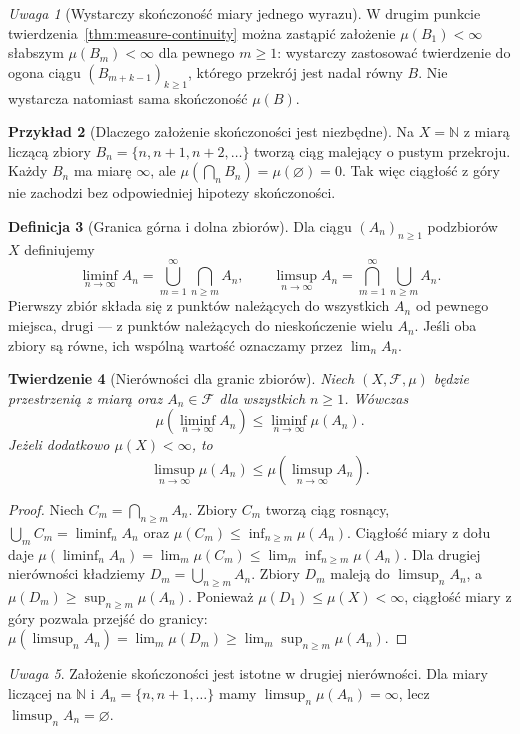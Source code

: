 \documentclass[11pt,a4paper,oneside]{book}
\numberwithin{equation}{chapter}
\theoremstyle{plain}
\newtheorem{twierdzenie}{Twierdzenie}[chapter]
\theoremstyle{definition}
\newtheorem{definicja}[twierdzenie]{Definicja}
\newtheorem{przyklad}[twierdzenie]{Przykład}
\theoremstyle{remark}
\newtheorem{uwaga}[twierdzenie]{Uwaga}
\begin{document}
\begin{uwaga}[Wystarczy skończoność miary jednego wyrazu]
W drugim punkcie twierdzenia~\ref{thm:measure-continuity} można
zastąpić założenie $\mu(B_1)<\infty$ słabszym
$\mu(B_m)<\infty$ dla pewnego $m\ge1$: wystarczy
zastosować twierdzenie do ogona ciągu
$(B_{m+k-1})_{k\ge1}$, którego przekrój jest nadal równy $B$.
Nie wystarcza natomiast sama skończoność $\mu(B)$.
\end{uwaga}

\begin{przyklad}[Dlaczego założenie skończoności jest niezbędne]
\label{ex:continuity-counterexample}
Na $X=\mathbb N$ z miarą liczącą zbiory
$B_n=\{n,n+1,n+2,\ldots\}$ tworzą ciąg malejący o pustym
przekroju. Każdy $B_n$ ma miarę $\infty$, ale
$\mu(\bigcap_nB_n)=\mu(\varnothing)=0$.
Tak więc ciągłość z góry nie zachodzi bez odpowiedniej
hipotezy skończoności.
\end{przyklad}

\begin{definicja}[Granica górna i dolna zbiorów]
\label{def:limsup-sets}
Dla ciągu $(A_n)_{n\geq1}$ podzbiorów $X$ definiujemy
\[
\liminf_{n\to\infty}A_n
=\bigcup_{m=1}^{\infty}\bigcap_{n\geq m}A_n,
\qquad
\limsup_{n\to\infty}A_n
=\bigcap_{m=1}^{\infty}\bigcup_{n\geq m}A_n.
\]
Pierwszy zbiór składa się z punktów należących do wszystkich
$A_n$ od pewnego miejsca, drugi --- z punktów należących do
nieskończenie wielu $A_n$. Jeśli oba zbiory są równe,
ich wspólną wartość oznaczamy przez $\lim_nA_n$.
\end{definicja}

\begin{twierdzenie}[Nierówności dla granic zbiorów]
\label{thm:fatou-for-sets}
Niech $(X,\mathcal F,\mu)$ będzie przestrzenią z miarą
oraz $A_n\in\mathcal F$ dla wszystkich $n\ge1$.
Wówczas
\[
 \mu(\liminf_{n\to\infty}A_n)
 \le \liminf_{n\to\infty}\mu(A_n).
\]
Jeżeli dodatkowo $\mu(X)<\infty$, to
\[
 \limsup_{n\to\infty}\mu(A_n)
 \le \mu(\limsup_{n\to\infty}A_n).
\]
\end{twierdzenie}
\begin{proof}
Niech $C_m=\bigcap_{n\ge m}A_n$.
Zbiory $C_m$ tworzą ciąg rosnący,
$\bigcup_m C_m=\liminf_n A_n$ oraz
$\mu(C_m)\le\inf_{n\ge m}\mu(A_n)$.
Ciągłość miary z dołu daje
$\mu(\liminf_n A_n)=\lim_m\mu(C_m)
\le\lim_m\inf_{n\ge m}\mu(A_n)$.
Dla drugiej nierówności kładziemy
$D_m=\bigcup_{n\ge m}A_n$.
Zbiory $D_m$ maleją do $\limsup_n A_n$,
a $\mu(D_m)\ge\sup_{n\ge m}\mu(A_n)$.
Ponieważ $\mu(D_1)\le\mu(X)<\infty$,
ciągłość miary z góry pozwala przejść do granicy:
$\mu(\limsup_n A_n)=\lim_m\mu(D_m)
\ge\lim_m\sup_{n\ge m}\mu(A_n)$.
\end{proof}
\begin{uwaga}
Założenie skończoności jest istotne w drugiej nierówności.
Dla miary liczącej na $\mathbb N$ i
$A_n=\{n,n+1,\ldots\}$ mamy
$\limsup_n\mu(A_n)=\infty$, lecz
$\limsup_n A_n=\varnothing$.
\end{uwaga}
\end{document}
